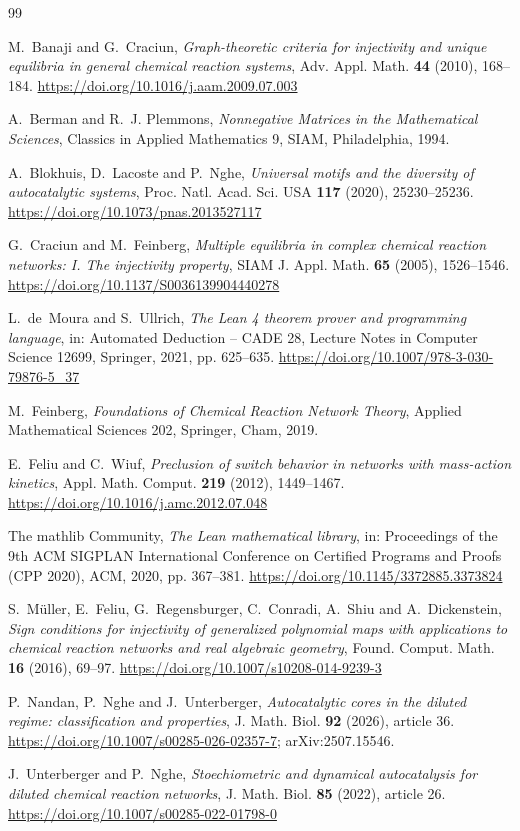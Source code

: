 \documentclass[11pt,reqno]{amsart}
\theoremstyle{plain}
\theoremstyle{definition}
\theoremstyle{remark}
\numberwithin{equation}{section}
\begin{document}
\begin{thebibliography}{99}

M.~Banaji and G.~Craciun,
\emph{Graph-theoretic criteria for injectivity and unique equilibria in general chemical reaction systems},
Adv. Appl. Math. \textbf{44} (2010), 168--184.
\url{https://doi.org/10.1016/j.aam.2009.07.003}

A.~Berman and R.~J. Plemmons,
\emph{Nonnegative Matrices in the Mathematical Sciences},
Classics in Applied Mathematics 9, SIAM, Philadelphia, 1994.

A.~Blokhuis, D.~Lacoste and P.~Nghe,
\emph{Universal motifs and the diversity of autocatalytic systems},
Proc. Natl. Acad. Sci. USA \textbf{117} (2020), 25230--25236.
\url{https://doi.org/10.1073/pnas.2013527117}

G.~Craciun and M.~Feinberg,
\emph{Multiple equilibria in complex chemical reaction networks: I. The injectivity property},
SIAM J. Appl. Math. \textbf{65} (2005), 1526--1546.
\url{https://doi.org/10.1137/S0036139904440278}

L.~de~Moura and S.~Ullrich,
\emph{The Lean 4 theorem prover and programming language},
in: Automated Deduction -- CADE 28, Lecture Notes in Computer Science 12699, Springer, 2021, pp. 625--635.
\url{https://doi.org/10.1007/978-3-030-79876-5_37}

M.~Feinberg,
\emph{Foundations of Chemical Reaction Network Theory},
Applied Mathematical Sciences 202, Springer, Cham, 2019.

E.~Feliu and C.~Wiuf,
\emph{Preclusion of switch behavior in networks with mass-action kinetics},
Appl. Math. Comput. \textbf{219} (2012), 1449--1467.
\url{https://doi.org/10.1016/j.amc.2012.07.048}

The mathlib Community,
\emph{The Lean mathematical library},
in: Proceedings of the 9th ACM SIGPLAN International Conference on Certified Programs and Proofs (CPP 2020), ACM, 2020, pp. 367--381.
\url{https://doi.org/10.1145/3372885.3373824}

S.~M\"uller, E.~Feliu, G.~Regensburger, C.~Conradi, A.~Shiu and A.~Dickenstein,
\emph{Sign conditions for injectivity of generalized polynomial maps with applications to chemical reaction networks and real algebraic geometry},
Found. Comput. Math. \textbf{16} (2016), 69--97.
\url{https://doi.org/10.1007/s10208-014-9239-3}

P.~Nandan, P.~Nghe and J.~Unterberger,
\emph{Autocatalytic cores in the diluted regime: classification and properties},
J. Math. Biol. \textbf{92} (2026), article 36.
\url{https://doi.org/10.1007/s00285-026-02357-7}; arXiv:2507.15546.

J.~Unterberger and P.~Nghe,
\emph{Stoechiometric and dynamical autocatalysis for diluted chemical reaction networks},
J. Math. Biol. \textbf{85} (2022), article 26.
\url{https://doi.org/10.1007/s00285-022-01798-0}

\end{thebibliography}
\end{document}
